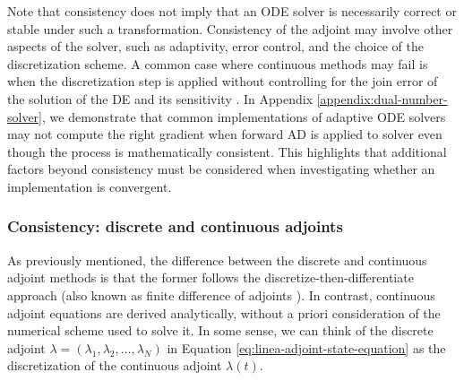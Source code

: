 Note that consistency does not imply that an ODE solver is necessarily correct or stable under such a transformation. 
Consistency of the adjoint may involve other aspects of the solver, such as adaptivity, error control, and the choice of the discretization scheme. 
A common case where continuous methods may fail is when the discretization step is applied without controlling for the join error of the solution of the DE and its sensitivity \cite{Gunzburger_2002}. 
In Appendix \ref{appendix:dual-number-solver}, we demonstrate that common implementations of adaptive ODE solvers may not compute the right gradient when forward AD is applied to solver even though the process is mathematically consistent. 
This highlights that additional factors beyond consistency must be considered when investigating whether an implementation is convergent.

\subsubsection{Consistency: discrete and continuous adjoints}

As previously mentioned, the difference between the discrete and continuous adjoint methods is that the former follows the discretize-then-differentiate approach (also known as finite difference of adjoints \cite{Sirkes_Tziperman_1997}).
In contrast, continuous adjoint equations are derived analytically, without a priori consideration of the numerical scheme used to solve it. 
In some sense, we can think of the discrete adjoint $\lambda = (\lambda_1, \lambda_2, \ldots, \lambda_N)$ in Equation \eqref{eq:linea-adjoint-state-equation} as the discretization of the continuous adjoint $\lambda(t)$. 

